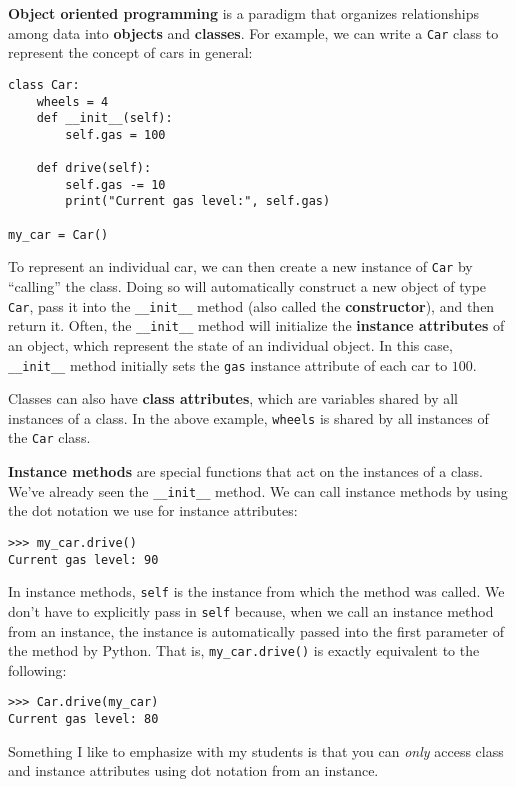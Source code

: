 \textbf{Object oriented programming} is a paradigm that organizes relationships among data into \textbf{objects} and \textbf{classes}. For example, we can write a \lstinline{Car} class to represent the concept of cars in general: 

\begin{lstlisting}
class Car:
    wheels = 4
    def __init__(self):
        self.gas = 100

    def drive(self):
        self.gas -= 10
        print("Current gas level:", self.gas)

my_car = Car()
\end{lstlisting}

To represent an individual car, we can then create a new instance of \lstinline{Car} by ``calling'' the class. Doing so will automatically construct a new object of type \lstinline{Car}, pass it into the \lstinline{__init__} method (also called the \textbf{constructor}), and then return it. Often, the \lstinline{__init__} method will initialize the \textbf{instance attributes} of an object, which represent the state of an individual object. In this case, \lstinline{__init__} method initially sets the \lstinline{gas} instance attribute of each car to $100$. 

Classes can also have \textbf{class attributes}, which are variables shared by all instances of a class. In the above example, \lstinline{wheels} is shared by all instances of the \lstinline{Car} class. 

\textbf{Instance methods} are special functions that act on the instances of a class. We've already seen the \lstinline{__init__} method. We can call instance methods by using the dot notation we use for instance attributes: 
\begin{lstlisting}
>>> my_car.drive()
Current gas level: 90
\end{lstlisting}
In instance methods, \lstinline{self} is the instance from which the method was called.  We don’t have to explicitly pass in \lstinline{self} because, when we call an instance method from an instance, the instance is automatically passed into the first parameter of the method by Python. That is, \lstinline{my_car.drive()} is exactly equivalent to the following: 
\begin{lstlisting}
>>> Car.drive(my_car)
Current gas level: 80
\end{lstlisting}

\begin{meta}
Something I like to emphasize with my students is that you can \textit{only} access class and instance attributes using dot notation from an instance. 
\end{meta}
